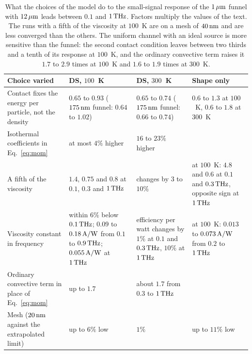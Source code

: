 \begin{table}
\caption{What the choices of the model do to the small-signal response
of the $1\um$ funnel with $12\um$ leads between $0.1$ and $1\THz$.
Factors multiply the values of the text. The runs with a fifth of the
viscosity at $100$~K are on a mesh of $40\nm$ and are less converged
than the others. The uniform channel with an ideal source is more
sensitive than the funnel: the second contact condition leaves between
two thirds and a tenth of its response at $100$~K, and the ordinary
convective term raises it $1.7$ to $2.9$ times at $100$~K and $1.6$ to
$1.9$ times at $300$~K.}
\label{tab:sens}
\begin{ruledtabular}
\begin{tabular}{L{0.26\textwidth}L{0.22\textwidth}L{0.19\textwidth}L{0.25\textwidth}}
Choice varied & DS, $100$~K & DS, $300$~K & Shape only \\
\hline
Contact fixes the energy per particle, not the density & $0.65$ to $0.93$ ($175\,\mathrm{nm}$ funnel: $0.64$ to $1.02$) & $0.65$ to $0.74$ ($175\,\mathrm{nm}$ funnel: $0.66$ to $0.74$) & $0.6$ to $1.3$ at $100$~K, $0.6$ to $1.8$ at $300$~K \\[3pt]
Isothermal coefficients in Eq.~\eqref{eq:mom} & at most $4\%$ higher & $16$ to $23\%$ higher & \\[3pt]
A fifth of the viscosity & $1.4$, $0.75$ and $0.8$ at $0.1$, $0.3$ and $1\THz$ & changes by $3$ to $10\%$ & at $100$~K: $4.8$ and $0.6$ at $0.1$ and $0.3\,\mathrm{THz}$, opposite sign at $1\THz$ \\[3pt]
Viscosity constant in frequency & within $6\%$ below $0.1\,\mathrm{THz}$; $0.09$ to $0.18\,\mathrm{A/W}$ from $0.1$ to $0.9\,\mathrm{THz}$; $0.055\,\mathrm{A/W}$ at $1\THz$ & efficiency per watt changes by $1\%$ at $0.1$ and $0.3\,\mathrm{THz}$, $10\%$ at $1\THz$ & at $100$~K: $0.013$ to $0.073\,\mathrm{A/W}$ from $0.2$ to $1\THz$ \\[3pt]
Ordinary convective term in place of Eq.~\eqref{eq:mom} & up to $1.7$ & about $1.7$ from $0.3$ to $1\THz$ & \\[3pt]
Mesh ($20\,\mathrm{nm}$ against the extrapolated limit) & up to $6\%$ low & $1\%$ & up to $11\%$ low \\
\end{tabular}
\end{ruledtabular}
\end{table}

